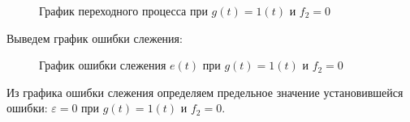 \documentclass[a4paper, 11pt]{article}
\begin{document}
\begin{figure}[h!]
\caption{График переходного процесса при $g(t)=1(t)$  и $f_2=0$}
\label{ris:image}
\end{figure}

\par 
Выведем график ошибки слежения:

\newpage
\begin{figure}[h!]
\caption{График ошибки слежения $e(t)$ при $g(t)=1(t)$  и $f_2=0$}
\label{ris:image}
\end{figure}

\par 	
Из графика ошибки слежения определяем предельное значение установившейся ошибки: $\varepsilon = 0$ при $g(t)=1(t)$  и $f_2=0$.
\end{document}
